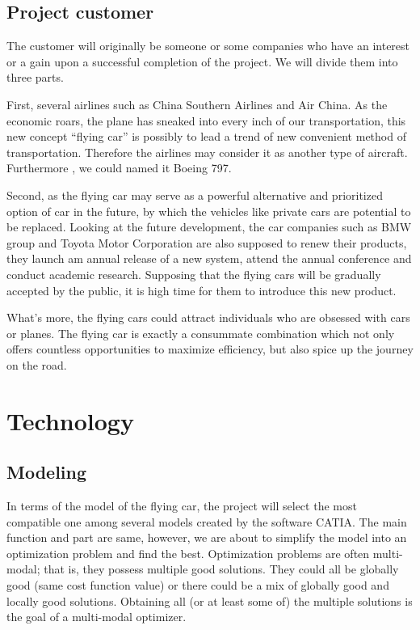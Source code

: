 \subsection{Project customer}

The customer will originally be someone or some companies who have an interest or a gain upon a successful completion of the project. We will divide them into three parts.

First, several airlines such as China Southern Airlines and Air China. As the economic roars, the plane has sneaked into every inch of our transportation, this new concept “flying car” is possibly to lead a trend of new convenient method of transportation. Therefore the airlines may consider it as another type of aircraft. Furthermore , we could named it Boeing 797.

Second, as the flying car may serve as a powerful alternative and prioritized option of car in the future, by which the vehicles like private cars are potential to be replaced. Looking at the future development, the car companies such as BMW group and Toyota Motor Corporation are also supposed to renew their products, they launch am annual release of a new system, attend the annual conference and conduct academic research. Supposing that the flying cars will be gradually accepted by the public, it is high time for them to introduce this new product.

What’s more, the flying cars could attract individuals who are obsessed with cars or planes. The flying car is exactly a consummate combination which not only offers countless opportunities to maximize efficiency, but also spice up the journey on the road.


\section{Technology}

\subsection{Modeling}

In terms of the model of the flying car, the project will select the most compatible one among several models created by the software CATIA. The main function and part are same, however, we are about to simplify the model into an optimization problem and find the best. Optimization problems are often multi-modal; that is, they possess multiple good solutions. They could all be globally good (same cost function value) or there could be a mix of globally good and locally good solutions. Obtaining all (or at least some of) the multiple solutions is the goal of a multi-modal optimizer. 

